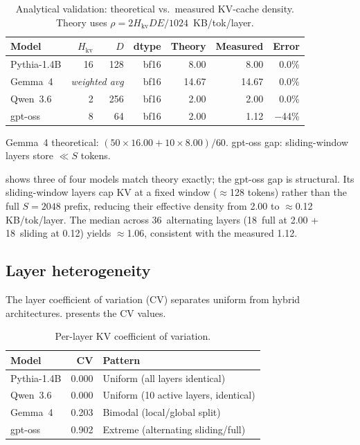 \documentclass[11pt,a4paper]{article}
\begin{document}
\begin{table}[t]
  \centering
  \small
  \caption{Analytical validation: theoretical vs.\ measured
    KV-cache density.  Theory uses
    $\rho = 2 H_\mathrm{kv} D E / 1024$~KB/tok/layer.}
  \label{tab:analytical}
  \begin{tabular}{@{}lrrrrrr@{}}
    \toprule
    \textbf{Model} & $H_\mathrm{kv}$ & $D$ & \textbf{dtype} & \textbf{Theory} & \textbf{Measured} & \textbf{Error} \\
    \midrule
    Pythia-1.4B  & 16 & 128 & bf16 &  8.00 &  8.00 &  0.0\% \\
    Gemma~4      & \multicolumn{2}{c}{\textit{weighted avg}} & bf16 & 14.67 & 14.67 &  0.0\% \\
    Qwen~3.6     &  2 & 256 & bf16 &  2.00 &  2.00 &  0.0\% \\
    gpt-oss      &  8 &  64 & bf16 &  2.00 &  1.12 & $-$44\% \\
    \bottomrule
  \end{tabular}
  \vspace{2pt}
  {\footnotesize Gemma~4 theoretical: $(50\times16.00 + 10\times8.00)/60$.
  gpt-oss gap: sliding-window layers store $\ll S$ tokens.}
\end{table}

 shows three of four models match theory
exactly; the gpt-oss gap is structural.
Its sliding-window layers cap KV at a fixed window ($\approx$128
tokens) rather than the full $S=2048$ prefix, reducing their
effective density from 2.00 to $\approx$0.12\,KB/tok/layer.
The median across 36~alternating layers (18~full at 2.00 +
18~sliding at 0.12) yields $\approx$1.06, consistent with the
measured 1.12.

\subsection{Layer heterogeneity}
\label{sec:results:cv}

The layer coefficient of variation (CV) separates uniform from
hybrid architectures.
 presents the CV values.

\begin{table}[t]
  \centering
  \small
  \caption{Per-layer KV coefficient of variation.}
  \label{tab:cv}
  \begin{tabular}{@{}lrl@{}}
    \toprule
    \textbf{Model} & \textbf{CV} & \textbf{Pattern} \\
    \midrule
    Pythia-1.4B  & 0.000 & Uniform (all layers identical) \\
    Qwen~3.6     & 0.000 & Uniform (10 active layers, identical) \\
    Gemma~4      & 0.203 & Bimodal (local/global split) \\
    gpt-oss      & 0.902 & Extreme (alternating sliding/full) \\
    \bottomrule
  \end{tabular}
\end{table}
\end{document}
